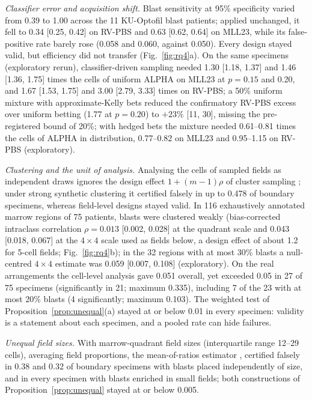 \documentclass[preprint,12pt]{elsarticle}
\theoremstyle{remark}
\theoremstyle{definition}
\begin{document}
\emph{Classifier error and acquisition shift.} Blast sensitivity at 95\% specificity varied from 0.39 to 1.00 across the 11 KU-Optofil blast patients; applied unchanged, it fell to 0.34 [0.25, 0.42] on RV-PBS and 0.63 [0.62, 0.64] on MLL23, while its false-positive rate barely rose (0.058 and 0.060, against 0.050). Every design stayed valid, but efficiency did not transfer (Fig.~\ref{fig:rq4}a). On the same specimens (exploratory rerun), classifier-driven sampling needed 1.30 [1.18, 1.37] and 1.46 [1.36, 1.75] times the cells of uniform ALPHA on MLL23 at $p=0.15$ and 0.20, and 1.67 [1.53, 1.75] and 3.00 [2.79, 3.33] times on RV-PBS; a 50\% uniform mixture with approximate-Kelly bets reduced the confirmatory RV-PBS excess over uniform betting (1.77 at $p=0.20$) to $+23\%$ [11, 30], missing the pre-registered bound of 20\%; with hedged bets the mixture needed 0.61--0.81 times the cells of ALPHA in distribution, 0.77--0.82 on MLL23 and 0.95--1.15 on RV-PBS (exploratory).

\emph{Clustering and the unit of analysis.} Analysing the cells of sampled fields as independent draws ignores the design effect $1+(m-1)\rho$ of cluster sampling \cite{kish1965}; under strong synthetic clustering it certified falsely in up to 0.478 of boundary specimens, whereas field-level designs stayed valid. In 116 exhaustively annotated marrow regions of 75 patients, blasts were clustered weakly (bias-corrected intraclass correlation $\rho=0.013$ [0.002, 0.028] at the quadrant scale and 0.043 [0.018, 0.067] at the $4\times4$ scale used as fields below, a design effect of about 1.2 for 5-cell fields; Fig.~\ref{fig:rq4}b); in the 32 regions with at most 30\% blasts a null-centred $4\times4$ estimate was 0.059 [0.007, 0.108] (exploratory). On the real arrangements the cell-level analysis gave 0.051 overall, yet exceeded 0.05 in 27 of 75 specimens (significantly in 21; maximum 0.335), including 7 of the 23 with at most 20\% blasts (4 significantly; maximum 0.103). The weighted test of Proposition~\ref{prop:unequal}(a) stayed at or below 0.01 in every specimen: validity is a statement about each specimen, and a pooled rate can hide failures.

\emph{Unequal field sizes.} With marrow-quadrant field sizes (interquartile range 12--29 cells), averaging field proportions, the mean-of-ratios estimator \cite{cochran1977}, certified falsely in 0.38 and 0.32 of boundary specimens with blasts placed independently of size, and in every specimen with blasts enriched in small fields; both constructions of Proposition~\ref{prop:unequal} stayed at or below 0.005.
\end{document}
